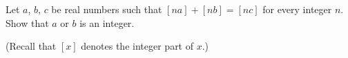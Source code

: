 Let $a$, $b$, $c$ be real numbers such that $[na] + [nb] = [nc]$ for every integer $n$. Show that $a$ or $b$ is an integer.

(Recall that $[x]$ denotes the integer part of $x$.)
